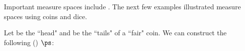 Important measure spaces include .
The next few examples illustrated measure spaces using 
coins and dice.
\begin{example}
\label{ex:msr_coin_flips}
Let \coinhead be the ``head" and \cointail be the ``tails" of a ``fair" coin.
We can construct the following  () $\ps$:
\end{example}


